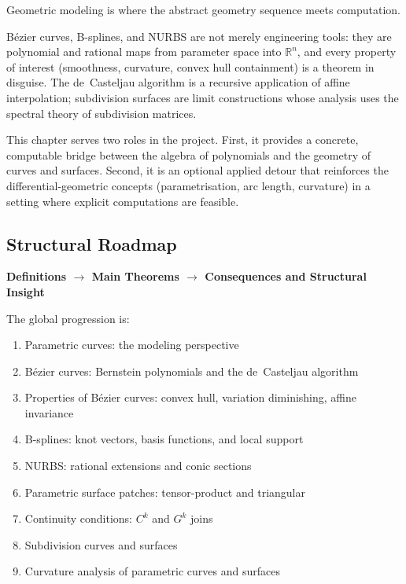 \begin{tcolorbox}[
  colback=gray!6,
  colframe=gray!40,
  arc=2pt,
  left=8pt, right=8pt, top=6pt, bottom=6pt,
  title={\small\textbf{Structural Role: Geometric Modeling — Geometry Made Computable}},
  fonttitle=\small\bfseries
]
Geometric modeling is where the abstract geometry sequence
meets computation.

B\'ezier curves, B-splines, and NURBS are not merely engineering
tools: they are polynomial and rational maps from parameter
space into $\mathbb{R}^n$, and every property of interest
(smoothness, curvature, convex hull containment) is a theorem
in disguise.
The de~Casteljau algorithm is a recursive application of
affine interpolation; subdivision surfaces are limit constructions
whose analysis uses the spectral theory of subdivision matrices.

This chapter serves two roles in the project.
First, it provides a concrete, computable bridge between the
algebra of polynomials and the geometry of curves and surfaces.
Second, it is an optional applied detour that reinforces the
differential-geometric concepts (parametrisation, arc length,
curvature) in a setting where explicit computations are feasible.
\end{tcolorbox}
\vspace{1em}

\subsection*{Structural Roadmap}

\begin{center}
\textbf{Definitions $\longrightarrow$ Main Theorems
$\longrightarrow$ Consequences and Structural Insight}
\end{center}

The global progression is:

\begin{enumerate}
  \item Parametric curves: the modeling perspective
  \item B\'ezier curves: Bernstein polynomials and the de~Casteljau
        algorithm
  \item Properties of B\'ezier curves: convex hull, variation
        diminishing, affine invariance
  \item B-splines: knot vectors, basis functions, and local support
  \item NURBS: rational extensions and conic sections
  \item Parametric surface patches: tensor-product and triangular
  \item Continuity conditions: $C^k$ and $G^k$ joins
  \item Subdivision curves and surfaces
  \item Curvature analysis of parametric curves and surfaces
\end{enumerate}

